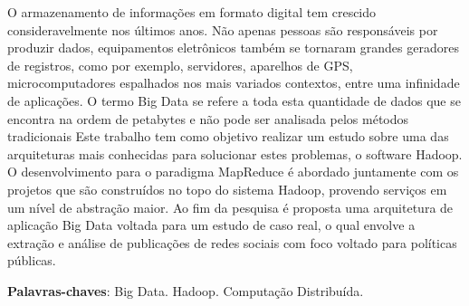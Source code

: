 \begin{resumo}

O armazenamento de informações em formato digital tem crescido consideravelmente nos últimos anos. Não apenas pessoas são responsáveis por produzir dados, equipamentos eletrônicos também se tornaram grandes geradores de registros, como por exemplo, servidores, aparelhos de GPS, microcomputadores espalhados nos mais variados contextos, entre uma infinidade de aplicações. O termo Big Data se refere a toda esta quantidade de dados que se encontra na ordem de petabytes e não pode ser analisada pelos métodos tradicionais Este trabalho tem como objetivo realizar um estudo sobre uma das arquiteturas mais conhecidas para solucionar estes problemas, o software  Hadoop. O desenvolvimento para o paradigma MapReduce é abordado juntamente com os projetos que são construídos no topo do sistema Hadoop, provendo serviços em um nível de abstração maior. Ao fim da pesquisa é proposta uma arquitetura de aplicação Big Data voltada para um estudo de caso real, o qual envolve a extração e análise de publicações de redes sociais com foco voltado para políticas públicas.

 \vspace{\onelineskip}
    
 \noindent
 \textbf{Palavras-chaves}: Big Data. Hadoop. Computação Distribuída.
\end{resumo}
